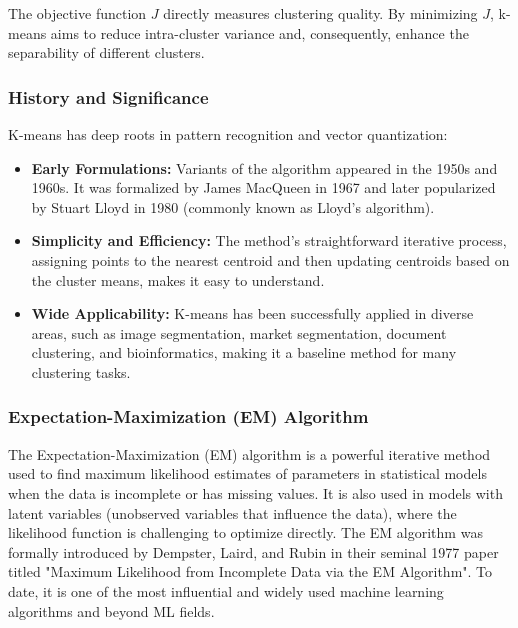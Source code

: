 \documentclass[12pt]{article}
\begin{document}
The objective function $J$ directly measures clustering quality. By minimizing $J$, k-means aims to reduce intra-cluster variance and, consequently, enhance the separability of different clusters.

\subsubsection{History and Significance}

K-means has deep roots in pattern recognition and vector quantization:
\begin{itemize}
    \item \textbf{Early Formulations:} Variants of the algorithm appeared in the 1950s and 1960s. It was formalized by James MacQueen in 1967 and later popularized by Stuart Lloyd in 1980 (commonly known as Lloyd’s algorithm).
    \item \textbf{Simplicity and Efficiency:} The method's straightforward iterative process, assigning points to the nearest centroid and then updating centroids based on the cluster means, makes it easy to understand.
    \item \textbf{Wide Applicability:} K-means has been successfully applied in diverse areas, such as image segmentation, market segmentation, document clustering, and bioinformatics, making it a baseline method for many clustering tasks.
\end{itemize}


\subsubsection{Expectation-Maximization (EM) Algorithm}
The Expectation-Maximization (EM) algorithm is a powerful iterative method used to find maximum likelihood estimates of parameters in statistical models when the data is incomplete or has missing values. It is also used in models with latent variables (unobserved variables that influence the data), where the likelihood function is challenging to optimize directly. The EM algorithm was formally introduced by Dempster, Laird, and Rubin in their seminal 1977 paper titled "Maximum Likelihood from Incomplete Data via the EM Algorithm". To date, it is one of the most influential and widely used machine learning algorithms and beyond ML fields. 
\end{document}
